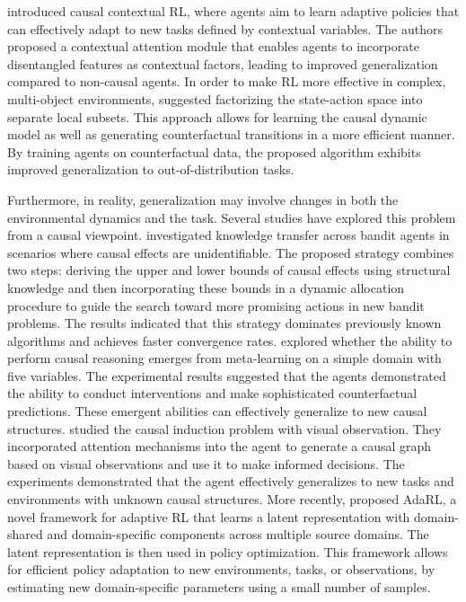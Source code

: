 \documentclass[10pt]{article} %
\theoremstyle{definition}
\begin{document}
\citet{eghbal-zadehLEARNINGINFERUNSEEN2021} introduced causal contextual RL, where agents aim to learn adaptive policies that can effectively adapt to new tasks defined by contextual variables. The authors proposed a contextual attention module that enables agents to incorporate disentangled features as contextual factors, leading to improved generalization compared to non-causal agents. In order to make RL more effective in complex, multi-object environments, \citet{pitisMoCoDAModelbasedCounterfactual2022a} suggested factorizing the state-action space into separate local subsets. This approach allows for learning the causal dynamic model as well as generating counterfactual transitions in a more efficient manner. By training agents on counterfactual data, the proposed algorithm exhibits improved generalization to out-of-distribution tasks.

Furthermore, in reality, generalization may involve changes in both the environmental dynamics and the task. Several studies have explored this problem from a causal viewpoint. \citet{zhangTransferLearningMultiArmed2017a} investigated knowledge transfer across bandit agents in scenarios where causal effects are unidentifiable. The proposed strategy combines two steps: deriving the upper and lower bounds of causal effects using structural knowledge and then incorporating these bounds in a dynamic allocation procedure to guide the search toward more promising actions in new bandit problems. The results indicated that this strategy dominates previously known algorithms and achieves faster convergence rates. \citet{dasguptaCausalReasoningMetareinforcement2018} explored whether the ability to perform causal reasoning emerges from meta-learning on a simple domain with five variables. The experimental results suggested that the agents demonstrated the ability to conduct interventions and make sophisticated counterfactual predictions. These emergent abilities can effectively generalize to new causal structures. \citet{nairCausalInductionVisual2019a} studied the causal induction problem with visual observation. They incorporated attention mechanisms into the agent to generate a causal graph based on visual observations and use it to make informed decisions. The experiments demonstrated that the agent effectively generalizes to new tasks and environments with unknown causal structures. More recently, \citet{huangAchievingCounterfactualFairness2022a} proposed AdaRL, a novel framework for adaptive RL that learns a latent representation with domain-shared and domain-specific components across multiple source domains. The latent representation is then used in policy optimization. This framework allows for efficient policy adaptation to new environments, tasks, or observations, by estimating new domain-specific parameters using a small number of samples.
\end{document}

